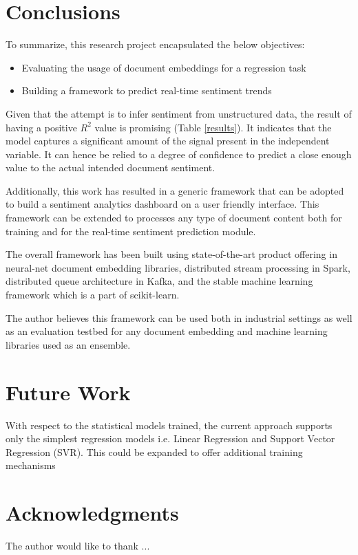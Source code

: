 \documentclass[conference]{IEEEtran}
\begin{document}
\vspace{5mm}

\section{Conclusions}
To summarize, this research project encapsulated the below objectives:
\begin{itemize}
    \item Evaluating the usage of document embeddings for a regression task
    \item Building a framework to predict real-time sentiment trends
\end{itemize}

Given that the attempt is to infer sentiment from unstructured data, the result of having a positive $R^2$ value is promising (Table \ref{results}).
It indicates that the model captures a significant amount of the signal present in the independent variable.
It can hence be relied to a degree of confidence to predict a close enough value to the actual intended document sentiment.

Additionally, this work has resulted in a generic framework that can be adopted to build a sentiment analytics dashboard on a user friendly interface. 
This framework can be extended to processes any type of document content both for training and for the real-time sentiment prediction module.

The overall framework has been built using state-of-the-art product offering in neural-net document embedding libraries, distributed stream processing in Spark, distributed queue architecture in Kafka, and the stable machine learning framework which is a part of scikit-learn. 

The author believes this framework can be used both in industrial settings as well as an evaluation testbed for any document embedding and machine learning libraries used as an ensemble.

\vspace{5mm}

\section{Future Work}
With respect to the statistical models trained, the current approach supports only the simplest regression models i.e. Linear Regression and Support Vector Regression (SVR). 
This could be expanded to offer additional training mechanisms

\vspace{5mm}

\section{Acknowledgments}
The author would like to thank ...

\vspace{5mm}



\end{document}
